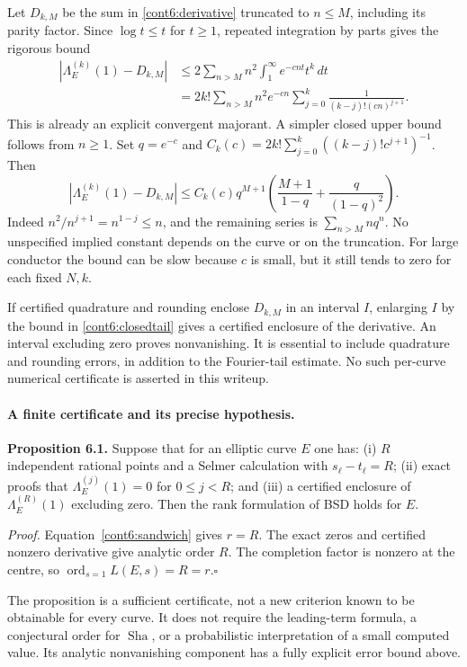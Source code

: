 \documentclass[11pt]{article}
\begin{document}
Let $D_{k,M}$ be the sum in \eqref{cont6:derivative} truncated to $n\le M$,
including its parity factor. Since $\log t\le t$ for $t\ge1$, repeated
integration by parts gives the rigorous bound
\begin{align}
 |\Lambda_E^{(k)}(1)-D_{k,M}|
 &\le 2\sum_{n>M}n^2\int_1^\infty e^{-cnt}t^k\,dt\\
 &=2k!\sum_{n>M}n^2e^{-cn}
      \sum_{j=0}^{k}\frac{1}{(k-j)!(cn)^{j+1}}.
 \label{cont6:tail}
\end{align}
This is already an explicit convergent majorant. A simpler closed upper
bound follows from $n\ge1$. Set $q=e^{-c}$ and
$C_k(c)=2k!\sum_{j=0}^k((k-j)!c^{j+1})^{-1}$. Then
\begin{equation}\label{cont6:closedtail}
 |\Lambda_E^{(k)}(1)-D_{k,M}|
 \le C_k(c)q^{M+1}
 \left(\frac{M+1}{1-q}+\frac{q}{(1-q)^2}\right).
\end{equation}
Indeed $n^2/n^{j+1}=n^{1-j}\le n$, and the remaining series is
$\sum_{n>M}nq^n$. No unspecified implied constant depends on the curve
or on the truncation. For large conductor the bound can be slow because
$c$ is small, but it still tends to zero for each fixed $N,k$.

If certified quadrature and rounding enclose $D_{k,M}$ in an interval
$I$, enlarging $I$ by the bound in \eqref{cont6:closedtail} gives a
certified enclosure of the derivative. An interval excluding zero proves
nonvanishing. It is essential to include quadrature and rounding errors,
in addition to the Fourier-tail estimate. No such per-curve numerical
certificate is asserted in this writeup.

\paragraph{A finite certificate and its precise hypothesis.}
\textbf{Proposition 6.1.} Suppose that for an elliptic curve $E$ one has:
(i) $R$ independent rational points and a Selmer calculation with
$s_\ell-t_\ell=R$; (ii) exact proofs that
$\Lambda_E^{(j)}(1)=0$ for $0\le j<R$; and (iii) a certified enclosure
of $\Lambda_E^{(R)}(1)$ excluding zero. Then the rank formulation of BSD
holds for $E$.

\emph{Proof.} Equation~\eqref{cont6:sandwich} gives $r=R$. The exact
zeros and certified nonzero derivative give analytic order $R$. The
completion factor is nonzero at the centre, so $\operatorname{ord}_{s=1}
L(E,s)=R=r$.\hfill$\square$

The proposition is a sufficient certificate, not a new criterion known
to be obtainable for every curve. It does not require the leading-term
formula, a conjectural order for $\operatorname{Sha}$, or a probabilistic interpretation
of a small computed value. Its analytic nonvanishing component has a
fully explicit error bound above.
\end{document}
